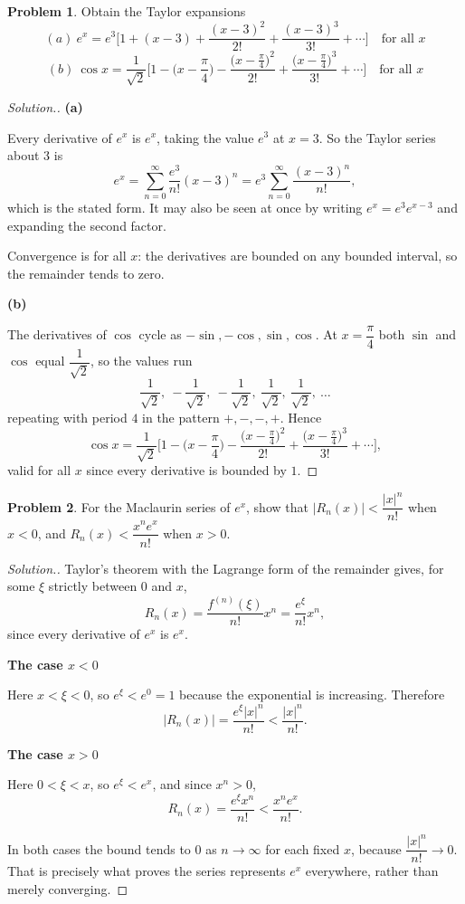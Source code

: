 \documentclass[11pt,a4paper]{article}
\theoremstyle{definition}
\newtheorem{problemx}{Problem}[subsection]
\newenvironment{problem}{\begin{problemx}}{\end{problemx}}
\newenvironment{solution}
  {\renewcommand{\qedsymbol}{}\begin{proof}[\textit{Solution}.]}
  {\end{proof}}
\newcommand{\subhead}[1]{%
  \par\medskip\noindent\textbf{#1}\par\nobreak\smallskip}
\begin{document}
\begin{problem}
Obtain the Taylor expansions
$$(a)\ e^x = e^3\Big[1 + (x-3) + \frac{(x-3)^2}{2!}
+ \frac{(x-3)^3}{3!} + \cdots\Big]\quad\text{for all }x$$
$$(b)\ \cos x = \frac{1}{\sqrt2}\Big[1 - \Big(x-\frac{\pi}{4}\Big)
- \frac{\big(x-\frac{\pi}{4}\big)^2}{2!}
+ \frac{\big(x-\frac{\pi}{4}\big)^3}{3!} + \cdots\Big]\quad\text{for all }x$$
\end{problem}
\begin{solution}
\subhead{(a)}
Every derivative of $e^x$ is $e^x$, taking the value $e^3$ at $x=3$. So the
Taylor series about $3$ is
$$e^x = \sum_{n=0}^{\infty}\frac{e^3}{n!}(x-3)^n
= e^3\sum_{n=0}^{\infty}\frac{(x-3)^n}{n!},$$
which is the stated form. It may also be seen at once by writing
$e^x = e^3e^{x-3}$ and expanding the second factor.

Convergence is for all $x$: the derivatives are bounded on any bounded interval,
so the remainder tends to zero.

\subhead{(b)}
The derivatives of $\cos$ cycle as $-\sin, -\cos, \sin, \cos$. At
$x = \dfrac{\pi}{4}$ both $\sin$ and $\cos$ equal $\dfrac{1}{\sqrt2}$, so the
values run
$$\frac{1}{\sqrt2},\ -\frac{1}{\sqrt2},\ -\frac{1}{\sqrt2},
\ \frac{1}{\sqrt2},\ \frac{1}{\sqrt2},\ \dots$$
repeating with period $4$ in the pattern $+,-,-,+$. Hence
$$\cos x = \frac{1}{\sqrt2}\Big[1 - \Big(x-\frac{\pi}{4}\Big)
- \frac{\big(x-\frac{\pi}{4}\big)^2}{2!}
+ \frac{\big(x-\frac{\pi}{4}\big)^3}{3!} + \cdots\Big],$$
valid for all $x$ since every derivative is bounded by $1$.
\end{solution}

\begin{problem}
For the Maclaurin series of $e^x$, show that
$\left|R_n(x)\right| < \dfrac{\left|x\right|^n}{n!}$ when $x<0$, and
$R_n(x) < \dfrac{x^ne^x}{n!}$ when $x>0$.
\end{problem}
\begin{solution}
Taylor's theorem with the Lagrange form of the remainder gives, for some $\xi$
strictly between $0$ and $x$,
$$R_n(x) = \frac{f^{(n)}(\xi)}{n!}x^n = \frac{e^{\xi}}{n!}x^n ,$$
since every derivative of $e^x$ is $e^x$.

\subhead{The case $x<0$}
Here $x<\xi<0$, so $e^{\xi}<e^0 = 1$ because the exponential is increasing.
Therefore
$$\left|R_n(x)\right| = \frac{e^{\xi}\left|x\right|^n}{n!}
< \frac{\left|x\right|^n}{n!}.$$

\subhead{The case $x>0$}
Here $0<\xi<x$, so $e^{\xi}<e^{x}$, and since $x^n>0$,
$$R_n(x) = \frac{e^{\xi}x^n}{n!} < \frac{x^ne^{x}}{n!}.$$

In both cases the bound tends to $0$ as $n\rightarrow\infty$ for each fixed $x$,
because $\dfrac{\left|x\right|^n}{n!}\rightarrow 0$. That is precisely what
proves the series represents $e^x$ everywhere, rather than merely converging.
\end{solution}
\end{document}
